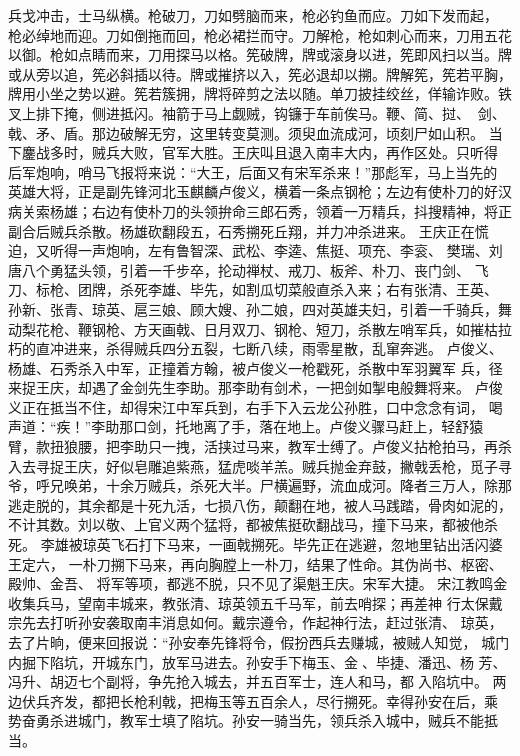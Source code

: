 兵戈冲击，士马纵横。枪破刀，刀如劈脑而来，枪必钓鱼而应。刀如下发而起，
枪必绰地而迎。刀如倒拖而回，枪必裙拦而守。刀解枪，枪如刺心而来，刀用五花
以御。枪如点睛而来，刀用探马以格。筅破牌，牌或滚身以进，筅即风扫以当。牌
或从旁以追，筅必斜插以待。牌或摧挤以入，筅必退却以搠。牌解筅，筅若平胸，
牌用小坐之势以避。筅若簇拥，牌将碎剪之法以随。单刀披挂绞丝，佯输诈败。铁
叉上排下掩，侧进抵闪。袖箭于马上觑贼，钩镰于车前俟马。鞭、简、挝、，剑、
戟、矛、盾。那边破解无穷，这里转变莫测。须臾血流成河，顷刻尸如山积。
当下鏖战多时，贼兵大败，官军大胜。王庆叫且退入南丰大内，再作区处。只听得
后军炮响，哨马飞报将来说：“大王，后面又有宋军杀来！”那彪军，马上当先的
英雄大将，正是副先锋河北玉麒麟卢俊义，横着一条点钢枪；左边有使朴刀的好汉
病关索杨雄；右边有使朴刀的头领拚命三郎石秀，领着一万精兵，抖搜精神，将正
副合后贼兵杀散。杨雄砍翻段五，石秀搠死丘翔，并力冲杀进来。
王庆正在慌迫，又听得一声炮响，左有鲁智深、武松、李逵、焦挺、项充、李衮、
樊瑞、刘唐八个勇猛头领，引着一千步卒，抡动禅杖、戒刀、板斧、朴刀、丧门剑、
飞刀、标枪、团牌，杀死李雄、毕先，如割瓜切菜般直杀入来；右有张清、王英、
孙新、张青、琼英、扈三娘、顾大嫂、孙二娘，四对英雄夫妇，引着一千骑兵，舞
动梨花枪、鞭钢枪、方天画戟、日月双刀、钢枪、短刀，杀散左哨军兵，如摧枯拉
朽的直冲进来，杀得贼兵四分五裂，七断八续，雨零星散，乱窜奔逃。
卢俊义、杨雄、石秀杀入中军，正撞着方翰，被卢俊义一枪戳死，杀散中军羽翼军
兵，径来捉王庆，却遇了金剑先生李助。那李助有剑术，一把剑如掣电般舞将来。
卢俊义正在抵当不住，却得宋江中军兵到，右手下入云龙公孙胜，口中念念有词，
喝声道：“疾！”李助那口剑，托地离了手，落在地上。卢俊义骤马赶上，轻舒猿
臂，款扭狼腰，把李助只一拽，活挟过马来，教军士缚了。卢俊义拈枪拍马，再杀
入去寻捉王庆，好似皂雕追紫燕，猛虎啖羊羔。贼兵抛金弃鼓，撇戟丢枪，觅子寻
爷，呼兄唤弟，十余万贼兵，杀死大半。尸横遍野，流血成河。降者三万人，除那
逃走脱的，其余都是十死九活，七损八伤，颠翻在地，被人马践踏，骨肉如泥的，
不计其数。刘以敬、上官义两个猛将，都被焦挺砍翻战马，撞下马来，都被他杀死。
李雄被琼英飞石打下马来，一画戟搠死。毕先正在逃避，忽地里钻出活闪婆王定六，
一朴刀搠下马来，再向胸膛上一朴刀，结果了性命。其伪尚书、枢密、殿帅、金吾、
将军等项，都逃不脱，只不见了渠魁王庆。宋军大捷。
宋江教鸣金收集兵马，望南丰城来，教张清、琼英领五千马军，前去哨探；再差神
行太保戴宗先去打听孙安袭取南丰消息如何。戴宗遵令，作起神行法，赶过张清、
琼英，去了片晌，便来回报说：“孙安奉先锋将令，假扮西兵去赚城，被贼人知觉，
城门内掘下陷坑，开城东门，放军马进去。孙安手下梅玉、金、毕捷、潘迅、杨
芳、冯升、胡迈七个副将，争先抢入城去，并五百军士，连人和马，都入陷坑中。
两边伏兵齐发，都把长枪利戟，把梅玉等五百余人，尽行搠死。幸得孙安在后，乘
势奋勇杀进城门，教军士填了陷坑。孙安一骑当先，领兵杀入城中，贼兵不能抵当。
